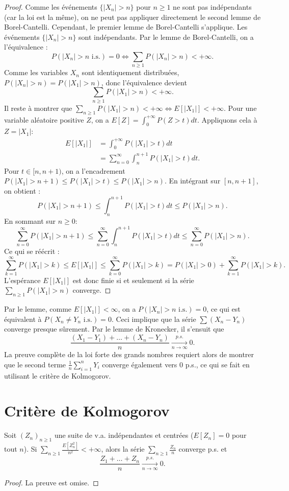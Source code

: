 \begin{proof}
Comme les événements $\{|X_n| > n\}$ pour $n \ge 1$ ne sont pas indépendants (car la loi est la même), on ne peut pas appliquer directement le second lemme de Borel-Cantelli. Cependant, le premier lemme de Borel-Cantelli s'applique. Les événements $\{|X_n|>n\}$ sont indépendants. Par le lemme de Borel-Cantelli, on a l'équivalence :
\[
P(|X_n| > n \text{ i.s.}) = 0 \iff \sum_{n \ge 1} P(|X_n| > n) < +\infty.
\]
Comme les variables $X_n$ sont identiquement distribuées, $P(|X_n| > n) = P(|X_1| > n)$, donc l'équivalence devient
\[
\sum_{n \ge 1} P(|X_1| > n) < +\infty.
\]
Il reste à montrer que $\sum_{n \ge 1} P(|X_1| > n) < +\infty \iff E[|X_1|] < +\infty$.
Pour une variable aléatoire positive $Z$, on a $E[Z] = \int_0^{+\infty} P(Z > t) dt$. Appliquons cela à $Z = |X_1|$:
\begin{align*}
E[|X_1|] &= \int_0^{+\infty} P(|X_1| > t) dt \\
&= \sum_{n=0}^{\infty} \int_n^{n+1} P(|X_1| > t) dt.
\end{align*}
Pour $t \in [n, n+1)$, on a l'encadrement $P(|X_1| > n+1) \le P(|X_1| > t) \le P(|X_1| > n)$. En intégrant sur $[n, n+1]$, on obtient :
\[
P(|X_1| > n+1) \le \int_n^{n+1} P(|X_1| > t) dt \le P(|X_1| > n).
\]
En sommant sur $n \ge 0$:
\[
\sum_{n=0}^{\infty} P(|X_1| > n+1) \le \sum_{n=0}^{\infty} \int_n^{n+1} P(|X_1| > t) dt \le \sum_{n=0}^{\infty} P(|X_1| > n).
\]
Ce qui se réécrit :
\[
\sum_{k=1}^{\infty} P(|X_1| > k) \le E[|X_1|] \le \sum_{k=0}^{\infty} P(|X_1| > k) = P(|X_1|>0) + \sum_{k=1}^{\infty} P(|X_1| > k).
\]
L'espérance $E[|X_1|]$ est donc finie si et seulement si la série $\sum_{n \ge 1} P(|X_1| > n)$ converge.
\end{proof}
Par le lemme, comme $E[|X_1|] < \infty$, on a $P(|X_n| > n \text{ i.s.}) = 0$, ce qui est équivalent à $P(X_n \ne Y_n \text{ i.s.}) = 0$.
Ceci implique que la série $\sum (X_n - Y_n)$ converge presque sûrement. Par le lemme de Kronecker, il s'ensuit que
\[
\frac{(X_1 - Y_1) + \dots + (X_n - Y_n)}{n} \xrightarrow[n\to\infty]{p.s.} 0.
\]
La preuve complète de la loi forte des grands nombres requiert alors de montrer que le second terme $\frac{1}{n}\sum_{i=1}^n Y_i$ converge également vers 0 p.s., ce qui se fait en utilisant le critère de Kolmogorov.
\section{Critère de Kolmogorov}
\begin{proposition}
Soit $(Z_n)_{n \ge 1}$ une suite de v.a. indépendantes et centrées ($E[Z_n]=0$ pour tout $n$).
Si $\sum_{n \ge 1} \frac{E[Z_n^2]}{n^2} < +\infty$, alors la série $\sum_{n \ge 1} \frac{Z_n}{n}$ converge p.s. et
\[
\frac{Z_1 + \dots + Z_n}{n} \xrightarrow[n\to\infty]{p.s.} 0.
\]
\end{proposition}
\begin{proof}
La preuve est omise.
\end{proof}
